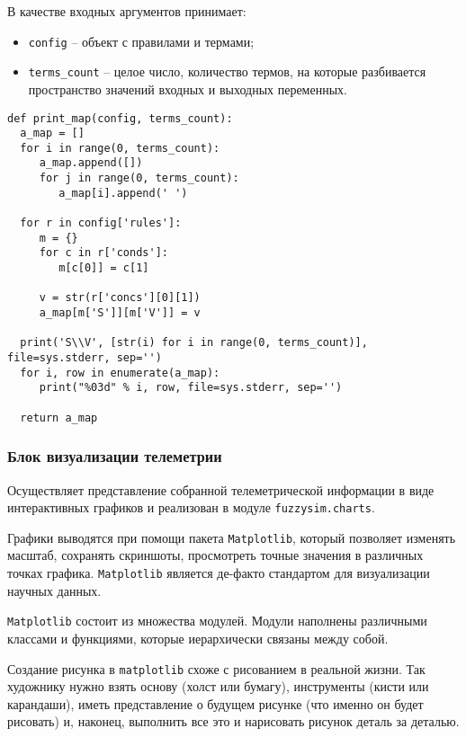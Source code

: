 В качестве входных аргументов принимает:
\begin{itemize}
	\item \lstinline!config! – объект с правилами и термами;
	\item \lstinline!terms_count! – целое число, количество термов, на которые разбивается пространство значений входных и выходных переменных.
\end{itemize}

\begin{lstlisting}[style=pythonstyle,caption={  }, label=lst:func:1]
def print_map(config, terms_count):
  a_map = []
  for i in range(0, terms_count):
     a_map.append([])
     for j in range(0, terms_count):
        a_map[i].append(' ')

  for r in config['rules']:
     m = {}
     for c in r['conds']:
        m[c[0]] = c[1]
        
     v = str(r['concs'][0][1])
     a_map[m['S']][m['V']] = v

  print('S\\V', [str(i) for i in range(0, terms_count)], file=sys.stderr, sep='')
  for i, row in enumerate(a_map):
     print("%03d" % i, row, file=sys.stderr, sep='')

  return a_map
\end{lstlisting}%
\subsubsection{ Блок визуализации телеметрии}


Осуществляет представление собранной телеметрической информации в виде интерактивных графиков и реализован в модуле \lstinline!fuzzysim.charts!.

Графики выводятся при помощи пакета \lstinline!Matplotlib!, который позволяет изменять масштаб, сохранять скриншоты, просмотреть точные значения в различных точках графика.  \lstinline!Matplotlib! является де-факто стандартом для визуализации научных данных.

\lstinline!Matplotlib! состоит из множества модулей. Модули наполнены различными классами и функциями, которые иерархически связаны между собой.

Создание рисунка в \lstinline!matplotlib! схоже с рисованием в реальной жизни. Так художнику нужно взять основу (холст или бумагу), инструменты (кисти или карандаши), иметь представление о будущем рисунке (что именно он будет рисовать) и, наконец, выполнить все это и нарисовать рисунок деталь за деталью.

